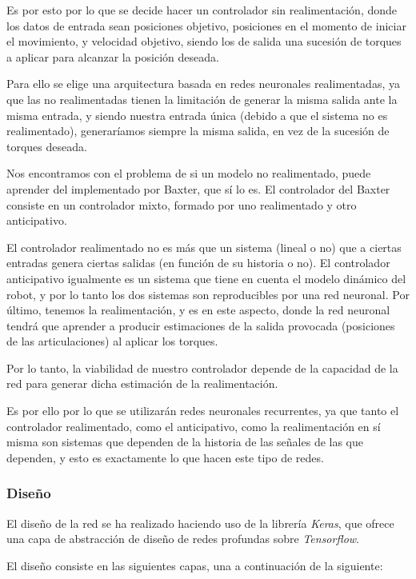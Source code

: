 Es por esto por lo que se decide hacer un controlador sin realimentación, donde los datos de entrada sean posiciones objetivo, posiciones en el momento de iniciar el movimiento, y velocidad objetivo, siendo los de salida una sucesión de torques a aplicar para alcanzar la posición deseada.

Para ello se elige una arquitectura basada en redes neuronales realimentadas, ya que las no realimentadas tienen la limitación de generar la misma salida ante la misma entrada, y siendo nuestra entrada única (debido a que el sistema no es realimentado), generaríamos siempre la misma salida, en vez de la sucesión de torques deseada.

Nos encontramos con el problema de si un modelo no realimentado, puede aprender del implementado por Baxter, que sí lo es. El controlador del Baxter consiste en un controlador mixto, formado por uno realimentado y otro anticipativo.

El controlador realimentado no es más que un sistema (lineal o no) que a ciertas entradas genera ciertas salidas (en función de su historia o no). El controlador anticipativo igualmente es un sistema que tiene en cuenta el modelo dinámico del robot, y por lo tanto los dos sistemas son reproducibles por una red neuronal. Por último, tenemos la realimentación, y es en este aspecto, donde la red neuronal tendrá que aprender a producir estimaciones de la salida provocada (posiciones de las articulaciones) al aplicar los torques.

Por lo tanto, la viabilidad de nuestro controlador depende de la capacidad de la red para generar dicha estimación de la realimentación.

Es por ello por lo que se utilizarán redes neuronales recurrentes, ya que tanto el controlador realimentado, como el anticipativo, como la realimentación en sí misma son sistemas que dependen de la historia de las señales de las que dependen, y esto es exactamente lo que hacen este tipo de redes.

\subsubsection{Diseño}
El diseño de la red se ha realizado haciendo uso de la librería \textit{Keras}, que ofrece una capa de abstracción de diseño de redes profundas sobre \textit{Tensorflow}.

El diseño consiste en las siguientes capas, una a continuación de la siguiente:


